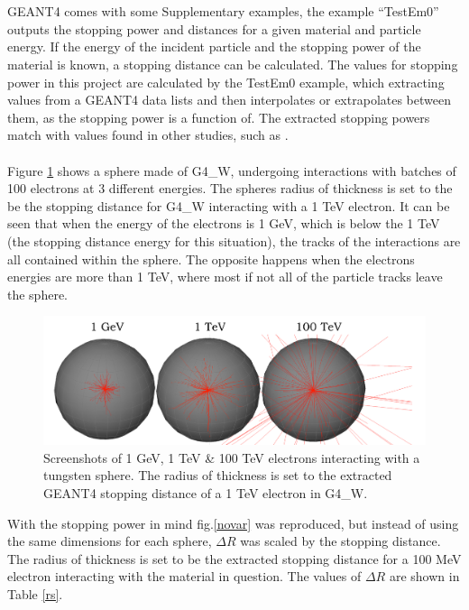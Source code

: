 \documentclass[12pt,a4paper]{article}
\begin{document}
\\\\
\noindent GEANT4 comes with some Supplementary examples, the example ``TestEm0'' \cite{emo} outputs the stopping power and distances for a given material and particle energy. If the energy of the incident particle and the stopping power of the material is known, a stopping distance can be calculated. The values for stopping power in this project are calculated by the TestEm0 example, which extracting values from a GEANT4 data lists and then interpolates or extrapolates between them, as the stopping power is a function of. The extracted stopping powers match with values found in other studies, such as \cite{stpdat}.
\\\\
Figure \ref{tung} shows a sphere made of G4\_W, undergoing interactions with batches of 100 electrons at 3 different energies. The spheres radius of thickness is set to the be the stopping distance for G4\_W interacting with a 1 TeV electron. It can be seen that when the energy of the electrons is 1 GeV, which is below the 1 TeV (the stopping distance energy for this situation), the tracks of the interactions are all contained within the sphere. The opposite happens when the electrons energies are more than 1 TeV, where most if not all of the particle tracks leave the sphere. 

\begin{figure}[h!]
\hspace*{1.4cm}\includegraphics[scale=0.5]{Images//BDSIM//Tungsten_Sphere.png}
\caption[width=\columnwidth]{Screenshots of 1 GeV, 1 TeV \& 100 TeV electrons interacting with a tungsten sphere. The radius of thickness is set to the extracted GEANT4 stopping distance of a 1 TeV electron in G4\_W.}
\label{tung}
\end{figure}

\noindent With the stopping power in mind fig.\ref{novar} was reproduced, but instead of using the same dimensions for each sphere, $\Delta R$ was scaled by the stopping distance. The radius of thickness is set to be the extracted stopping distance for a 100 MeV electron interacting with the material in question. The values of $\Delta R$ are shown in Table \ref{rs}.
\end{document}
